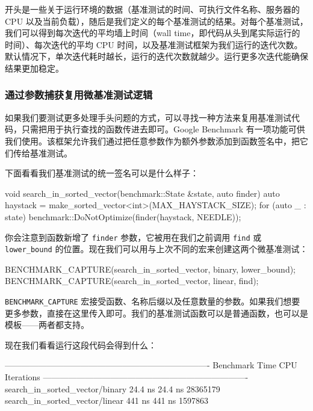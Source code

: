 开头是一些关于运行环境的数据（基准测试的时间、可执行文件名称、服务器的 CPU 以及当前负载），随后是我们定义的每个基准测试的结果。对每个基准测试，我们可以得到每次迭代的平均墙上时间（wall time，即代码从头到尾实际运行的时间）、每次迭代的平均 CPU 时间，以及基准测试框架为我们运行的迭代次数。默认情况下，单次迭代耗时越长，运行的迭代次数就越少。运行更多次迭代能确保结果更加稳定。

\subsubsection{通过参数捕获复用微基准测试逻辑}

\label{idx:1168}
如果我们要测试更多处理手头问题的方式，可以寻找一种方法来复用基准测试代码，只需把用于执行查找的函数传进去即可。Google Benchmark 有一项功能可供我们使用。该框架允许我们通过把任意参数作为额外参数添加到函数签名中，把它们传给基准测试。

下面看看我们基准测试的统一签名可以是什么样子：

\begin{codebox}[text]
void search_in_sorted_vector(benchmark::State &state, auto finder) {
  auto haystack = make_sorted_vector<int>(MAX_HAYSTACK_SIZE);
  for (auto _ : state) {
    benchmark::DoNotOptimize(finder(haystack, NEEDLE));
  }
}
\end{codebox}

你会注意到函数新增了 \texttt{finder} 参数，它被用在我们之前调用 \texttt{find} 或 \texttt{lower\_\allowbreak{}bound} 的位置。现在我们可以用与上次不同的宏来创建这两个微基准测试：

\begin{codebox}[text]
BENCHMARK_CAPTURE(search_in_sorted_vector, binary, lower_bound);
BENCHMARK_CAPTURE(search_in_sorted_vector, linear, find);
\end{codebox}

\texttt{BENCHMARK\_\allowbreak{}CAPTURE} 宏接受函数、名称后缀以及任意数量的参数。如果我们想要更多参数，直接在这里传入即可。我们的基准测试函数可以是普通函数，也可以是模板——两者都支持。

现在我们看看运行这段代码会得到什么：

\begin{codebox}[text]
-------------------------------------------------------------------------
Benchmark                               Time             CPU   Iterations
-------------------------------------------------------------------------
search_in_sorted_vector/binary       24.4 ns         24.4 ns     28365179
search_in_sorted_vector/linear        441 ns          441 ns      1597863
\end{codebox}

